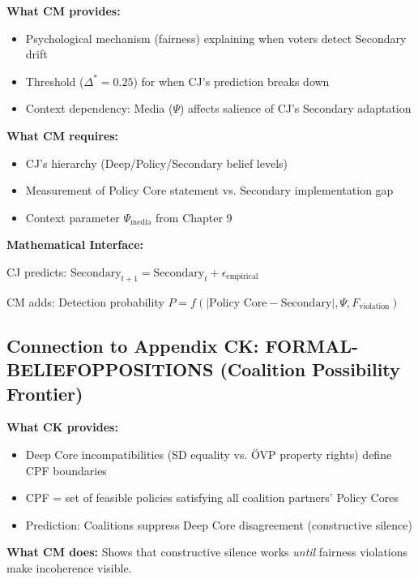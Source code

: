 \begin{tcolorbox}[colback=yellow!5!white, colframe=yellow!75!black,
    title=Integration: Appendix CM $\leftrightarrow$ Appendix CJ (Sabatier)]

\textbf{What CM provides:}
\begin{itemize}[nosep]
\item Psychological mechanism (fairness) explaining when voters detect Secondary drift
\item Threshold ($\Delta^* = 0.25$) for when CJ's prediction breaks down
\item Context dependency: Media ($\Psi$) affects salience of CJ's Secondary adaptation
\end{itemize}

\textbf{What CM requires:}
\begin{itemize}[nosep]
\item CJ's hierarchy (Deep/Policy/Secondary belief levels)
\item Measurement of Policy Core statement vs. Secondary implementation gap
\item Context parameter $\Psi_{\text{media}}$ from Chapter 9
\end{itemize}

\textbf{Mathematical Interface:}

CJ predicts: $\text{Secondary}_{t+1} = \text{Secondary}_t + \epsilon_{\text{empirical}}$

CM adds: Detection probability $P = f(|\text{Policy Core} - \text{Secondary}|, \Psi, F_{\text{violation}})$

\end{tcolorbox}

\subsection{Connection to Appendix CK: FORMAL-BELIEFOPPOSITIONS (Coalition Possibility Frontier)}

\textbf{What CK provides:}
\begin{itemize}[nosep]
\item Deep Core incompatibilities (SD equality vs. ÖVP property rights) define CPF boundaries
\item CPF = set of feasible policies satisfying all coalition partners' Policy Cores
\item Prediction: Coalitions suppress Deep Core disagreement (constructive silence)
\end{itemize}

\textbf{What CM does:}
Shows that constructive silence works \textit{until} fairness violations make incoherence visible.

